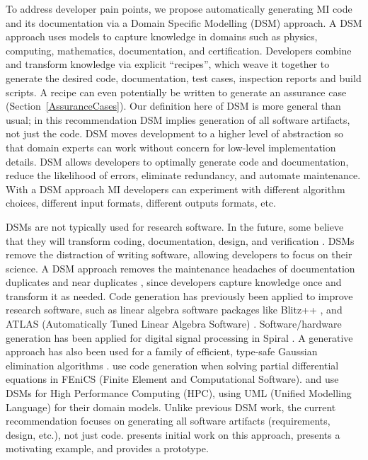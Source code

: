 \documentclass[final, 3p, times, authoryear]{elsarticle}
\begin{document}
To address developer pain points, we propose automatically generating MI code
and its documentation via a Domain Specific Modelling (DSM) approach. A DSM
approach uses models to capture knowledge in domains such as physics, computing,
mathematics, documentation, and certification.  Developers combine and transform
knowledge via explicit ``recipes'', which weave it together to generate the
desired code, documentation, test cases, inspection reports and build scripts. A
recipe can even potentially be written to generate an assurance case
(Section~\ref{AssuranceCases}). Our definition here of DSM is more general than
usual; in this recommendation DSM implies generation of all software artifacts,
not just the code. DSM moves development to a higher level of abstraction so
that domain experts can work without concern for low-level implementation
details. DSM allows developers to optimally generate code and documentation,
reduce the likelihood of errors, eliminate redundancy, and automate maintenance.
With a DSM approach MI developers can experiment with different algorithm
choices, different input formats, different outputs formats, etc.

DSMs are not typically used for research software.  In the future, some believe
that they will transform coding, documentation, design, and verification
\citep{JohansonAndHasselbring2018, Smith2018}. DSMs remove the distraction of
writing software, allowing developers to focus on their science.  A DSM approach
removes the maintenance headaches of documentation duplicates and near
duplicates \citep{LucivEtAl2018}, since developers capture knowledge once and
transform it as needed.  Code generation has previously been applied to improve
research software, such as linear algebra software packages like Blitz++
\citep{Veldhuizen1998}, and ATLAS (Automatically Tuned Linear Algebra Software)
\citep{WhaleyEtAl2001}.  Software/hardware generation has been applied for
digital signal processing in Spiral \citep{Pueschel2001}. A generative approach
has also been used for a family of efficient, type-safe Gaussian elimination
algorithms \citet{Carette2008}. \citep{LoggEtAl2012} use code generation when
solving partial differential equations in FEniCS (Finite Element and
Computational Software). \citet{MatkerimEtAl2013} and \citet{OberEtAl2018} use
DSMs for High Performance Computing (HPC), using UML (Unified Modelling
Language) for their domain models. Unlike previous DSM work, the current
recommendation focuses on generating all software artifacts (requirements,
design, etc.), not just code. \citet{SzymczakEtAl2016} presents initial work on
this approach, \citet{SmithAndCarette2021-BRIC} presents a motivating example,
and \citep{CaretteEtAl2021-Drasil} provides a prototype.
\end{document}
